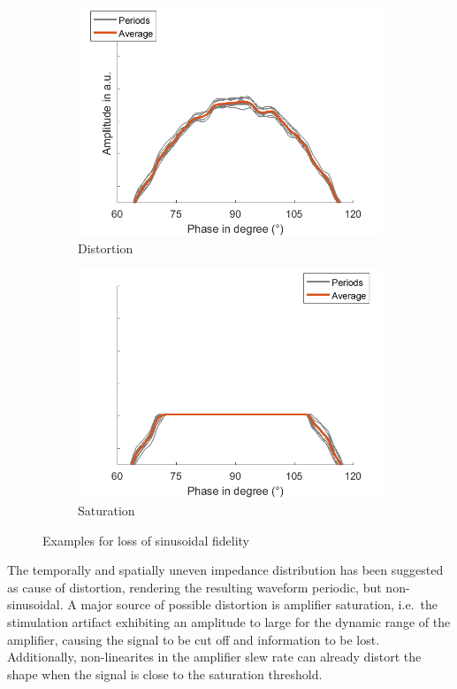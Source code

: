\documentclass[a4paper]{article}
\begin{document}
\begin{figure}[hbtp]
    \begin{subfigure}{.5\textwidth}
    \includegraphics[width=\textwidth]{./img/intro/distortion.png}
    \caption{Distortion}\label{fig:distortion}
    \end{subfigure}
    \begin{subfigure}{.5\textwidth}
    \includegraphics[width=\textwidth]{./img/intro/saturation.png}
    \caption{Saturation}\label{fig:saturation}
    \end{subfigure}
    \caption{Examples for loss of sinusoidal fidelity}\label{fig:nonsinus}
\end{figure}

The temporally and spatially uneven impedance distribution has been suggested as cause of distortion, rendering the resulting waveform periodic, but non-sinusoidal.
A major source of possible distortion is amplifier saturation, i.e.\ the stimulation artifact exhibiting an amplitude to large for the dynamic range of the amplifier, causing the signal to be cut off and information to be lost.
Additionally, non-linearites in the amplifier slew rate can already distort the shape when the signal is close to the saturation threshold.
\end{document}
